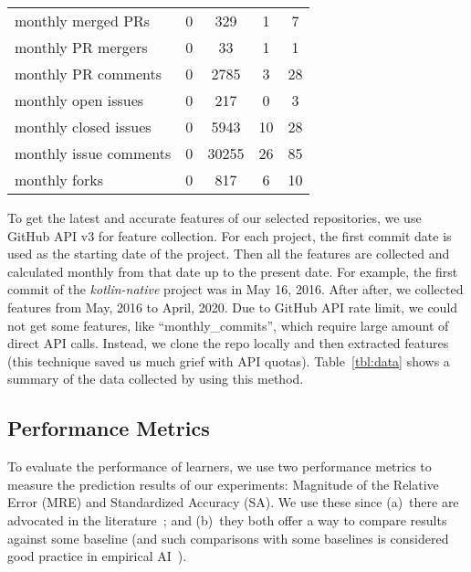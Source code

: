 \documentclass[sigconf,review,anonymous]{acmart}
\begin{document}
\begin{table}[!t]
\begin{adjustbox}{max width=0.42\textwidth}
\begin{tabular}{l|cccc}
{\color[HTML]{000000} monthly merged PRs} & {\color[HTML]{000000} 0} & {\color[HTML]{000000} 329} & {\color[HTML]{000000} 1} & {\color[HTML]{000000} 7} \\
\rowcolor[HTML]{FFFFFF} 
{\color[HTML]{000000} monthly PR mergers} & {\color[HTML]{000000} 0} & {\color[HTML]{000000} 33} & {\color[HTML]{000000} 1} & {\color[HTML]{000000} 1} \\
\rowcolor[HTML]{F3F3F3} 
{\color[HTML]{000000} monthly PR comments} & {\color[HTML]{000000} 0} & {\color[HTML]{000000} 2785} & {\color[HTML]{000000} 3} & {\color[HTML]{000000} 28} \\
\rowcolor[HTML]{FFFFFF} 
{\color[HTML]{000000} monthly open issues} & {\color[HTML]{000000} 0} & {\color[HTML]{000000} 217} & {\color[HTML]{000000} 0} & {\color[HTML]{000000} 3} \\
\rowcolor[HTML]{F3F3F3} 
{\color[HTML]{000000} monthly closed issues} & {\color[HTML]{000000} 0} & {\color[HTML]{000000} 5943} & {\color[HTML]{000000} 10} & {\color[HTML]{000000} 28} \\
\rowcolor[HTML]{FFFFFF} 
{\color[HTML]{000000} monthly issue comments} & {\color[HTML]{000000} 0} & {\color[HTML]{000000} 30255} & {\color[HTML]{000000} 26} & {\color[HTML]{000000} 85} \\
\rowcolor[HTML]{F3F3F3} 
{\color[HTML]{000000} monthly forks} & {\color[HTML]{000000} 0} & {\color[HTML]{000000} 817} & {\color[HTML]{000000} 6} & {\color[HTML]{000000} 10}
\end{tabular}
\end{adjustbox}
\end{table}



To get the latest and accurate features
of our selected repositories,  we use GitHub API v3 for feature collection. For each project, the first commit date is
used as the starting date of the project. Then all the features are collected and calculated monthly
from that date up to the present date. For example, the first commit of
the {\it kotlin-native} project was in May 16,  2016.
After after, we collected  features from May, 2016 to April, 2020. Due to GitHub API rate limit, we could not get some features, like ``monthly\_commits'', which require large amount of direct API calls. Instead, we clone the repo locally and then extracted   features (this technique saved us much grief with API  quotas). 
Table~\ref{tbl:data} shows a summary of the data collected by using this method. 


\subsection{Performance Metrics}
To evaluate the performance of learners, we use two performance metrics to measure the prediction results of our experiments: Magnitude of the Relative Error (MRE) and Standardized Accuracy (SA). We use these since (a)~there are advocated in the literature~\cite{shepperd2012evaluating,sarro2016multi}; and (b)~they both offer a way to compare results against some baseline
(and such  comparisons with some baselines is considered good practice in empirical AI~\cite{Cohen95}).
\end{document}
